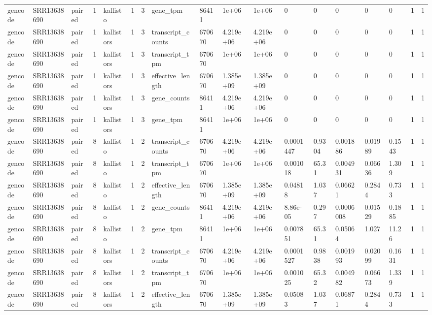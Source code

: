 \begin{tabular}{llllllllllllllllll}
gencode & SRR13638690 & paired & 1 & kallisto & 1 & 3 & gene\_tpm & 86411 & 1e+06 & 1e+06 & 0 & 0 & 0 & 0 & 0 & 1 & 1 \\
gencode & SRR13638690 & paired & 1 & kallistors & 1 & 3 & transcript\_counts & 670670 & 4.219e+06 & 4.219e+06 & 0 & 0 & 0 & 0 & 0 & 1 & 1 \\
gencode & SRR13638690 & paired & 1 & kallistors & 1 & 3 & transcript\_tpm & 670670 & 1e+06 & 1e+06 & 0 & 0 & 0 & 0 & 0 & 1 & 1 \\
gencode & SRR13638690 & paired & 1 & kallistors & 1 & 3 & effective\_length & 670670 & 1.385e+09 & 1.385e+09 & 0 & 0 & 0 & 0 & 0 & 1 & 1 \\
gencode & SRR13638690 & paired & 1 & kallistors & 1 & 3 & gene\_counts & 86411 & 4.219e+06 & 4.219e+06 & 0 & 0 & 0 & 0 & 0 & 1 & 1 \\
gencode & SRR13638690 & paired & 1 & kallistors & 1 & 3 & gene\_tpm & 86411 & 1e+06 & 1e+06 & 0 & 0 & 0 & 0 & 0 & 1 & 1 \\
gencode & SRR13638690 & paired & 8 & kallisto & 1 & 2 & transcript\_counts & 670670 & 4.219e+06 & 4.219e+06 & 0.0001447 & 0.9304 & 0.001886 & 0.01989 & 0.1543 & 1 & 1 \\
gencode & SRR13638690 & paired & 8 & kallisto & 1 & 2 & transcript\_tpm & 670670 & 1e+06 & 1e+06 & 0.001018 & 65.31 & 0.004931 & 0.06636 & 1.309 & 1 & 1 \\
gencode & SRR13638690 & paired & 8 & kallisto & 1 & 2 & effective\_length & 670670 & 1.385e+09 & 1.385e+09 & 0.04818 & 1.037 & 0.06621 & 0.2844 & 0.733 & 1 & 1 \\
gencode & SRR13638690 & paired & 8 & kallisto & 1 & 2 & gene\_counts & 86411 & 4.219e+06 & 4.219e+06 & 8.86e-05 & 0.297 & 0.0006008 & 0.01529 & 0.1885 & 1 & 1 \\
gencode & SRR13638690 & paired & 8 & kallisto & 1 & 2 & gene\_tpm & 86411 & 1e+06 & 1e+06 & 0.007851 & 65.31 & 0.05064 & 1.027 & 11.26 & 1 & 1 \\
gencode & SRR13638690 & paired & 8 & kallistors & 1 & 2 & transcript\_counts & 670670 & 4.219e+06 & 4.219e+06 & 0.0001527 & 0.9838 & 0.001993 & 0.02099 & 0.1631 & 1 & 1 \\
gencode & SRR13638690 & paired & 8 & kallistors & 1 & 2 & transcript\_tpm & 670670 & 1e+06 & 1e+06 & 0.001025 & 65.32 & 0.004982 & 0.06673 & 1.339 & 1 & 1 \\
gencode & SRR13638690 & paired & 8 & kallistors & 1 & 2 & effective\_length & 670670 & 1.385e+09 & 1.385e+09 & 0.05083 & 1.037 & 0.06871 & 0.2844 & 0.733 & 1 & 1 \\

\end{tabular}
